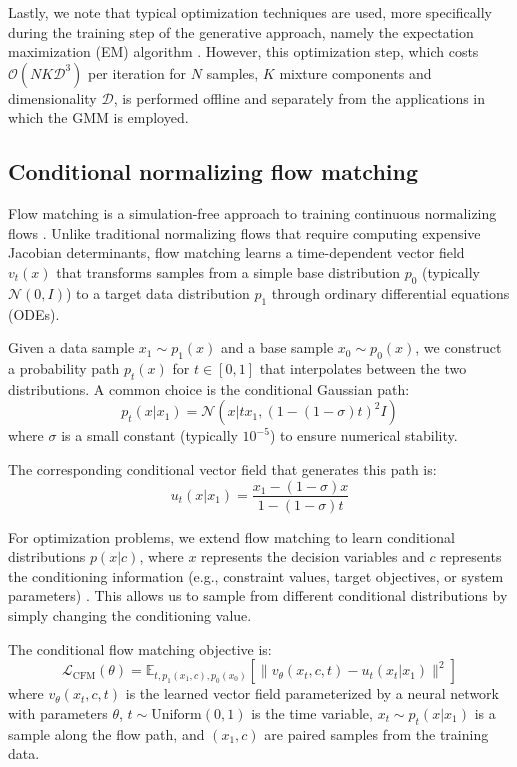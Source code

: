 \documentclass{achemso}
\begin{document}
Lastly, we note that typical optimization techniques are used, more specifically during the training step of the generative approach, namely the expectation maximization (EM) algorithm \cite{nips1993_EM}. However, this optimization step, which costs \(\mathcal{O}(N K \mathcal{D}^3)\) per iteration for \(N\) samples, \(K\) mixture components and dimensionality \(\mathcal{D}\), is performed offline and separately from the applications in which the GMM is employed.

\subsection{Conditional normalizing flow matching}

Flow matching is a simulation-free approach to training continuous normalizing flows \cite{lipman2023flow}. Unlike traditional normalizing flows that require computing expensive Jacobian determinants, flow matching learns a time-dependent vector field \(v_t(x)\) that transforms samples from a simple base distribution \(p_0\) (typically \(\mathcal{N}(0, I)\)) to a target data distribution \(p_1\) through ordinary differential equations (ODEs).

Given a data sample \(x_1 \sim p_1(x)\) and a base sample \(x_0 \sim p_0(x)\), we construct a probability path \(p_t(x)\) for \(t \in [0, 1]\) that interpolates between the two distributions. A common choice is the conditional Gaussian path:
\begin{equation}
p_t(x | x_1) = \mathcal{N}(x | t x_1, (1-(1-\sigma)t)^2 I)
\end{equation}
where \(\sigma\) is a small constant (typically \(10^{-5}\)) to ensure numerical stability.

The corresponding conditional vector field that generates this path is:
\begin{equation}
u_t(x | x_1) = \frac{x_1 - (1-\sigma)x}{1-(1-\sigma)t}
\end{equation}

For optimization problems, we extend flow matching to learn conditional distributions \(p(x|c)\), where \(x\) represents the decision variables and \(c\) represents the conditioning information (e.g., constraint values, target objectives, or system parameters)  \cite{tong2023improving}. This allows us to sample from different conditional distributions by simply changing the conditioning value.

The conditional flow matching objective is:
\begin{equation}
\mathcal{L}_\text{CFM}(\theta) = \mathbb{E}_{t, p_1(x_1,c), p_0(x_0)} \left[ \| v_\theta(x_t, c, t) - u_t(x_t | x_1) \|^2 \right]
\end{equation}
where \(v_\theta(x_t, c, t)\) is the learned vector field parameterized by a neural network with parameters \(\theta\), \(t \sim \text{Uniform}(0,1)\) is the time variable, \(x_t \sim p_t(x | x_1)\) is a sample along the flow path, and \((x_1, c)\) are paired samples from the training data.
\end{document}
